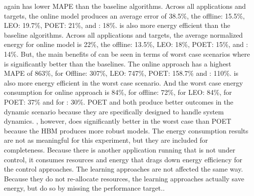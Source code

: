 \SYSTEM{} again has lower MAPE than the baseline algorithms. Across
all applications and targets, the online model produces an average
error of 38.5\%, the offline: 15.5\%, LEO: 19.7\%, POET: 21\%, and \SYSTEM{}:
18\%. \SYSTEM{} is also more energy efficient than the baseline algorithms. Across
all applications and targets, the average normalized energy for online model is 22\%, the offline: 13.5\%, LEO: 18\%, POET: 15\%, and \SYSTEM{}: 14\%. But, the main benefits of \SYSTEM{} can be seen in terms of worst case scenarios where \SYSTEM{} is significantly better than the baselines. The online approach has a highest MAPE
of 863\%, for  Offline: 307\%,  LEO: 747\%, POET: 158.7\% and \SYSTEM{}: 110\%.  \SYSTEM{} is also more energy efficient in the worst case scenario. And the worst case energy consumption for online approach is 84\%, for offline: 72\%, for LEO: 84\%, for POET: 37\% and for \SYSTEM{}: 30\%. POET and \SYSTEM{} both produce better outcomes in the
dynamic scenario because they are specifically designed to handle
system dynamics.  \SYSTEM{}, however, does significantly better in the
worst case than POET because the HBM produces more robust models.
The energy consumption results are not as meaningful for this
experiment, but they are included for completeness.  Because there is
another application running that is not under control, it consumes
resources and energy that drags down energy efficiency for the control
approaches.  The learning approaches are not affected the same way.
Because they do not re-allocate resources, the learning approaches
actually save energy, but do so by missing the performance target..



